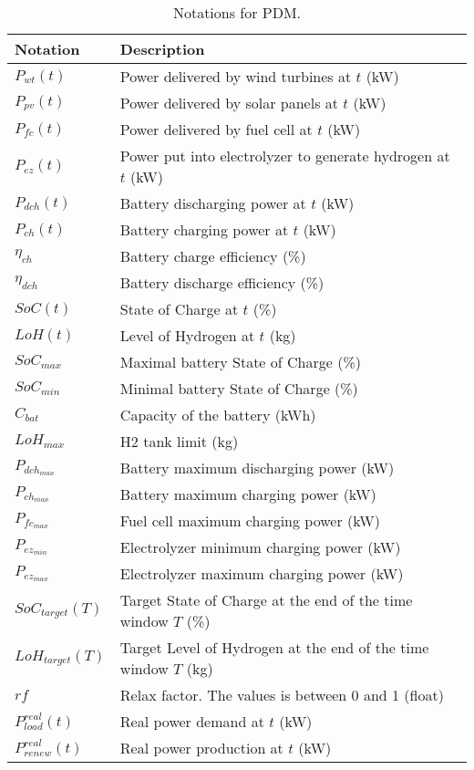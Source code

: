 \begin{table*}[!htb]
\centering
\caption{Notations for PDM.}
\label{tab:notation_power}
\begin{tabular}{l|l}
    \hline
    Notation & Description \\\hline\hline
    $P_{wt}(t)$ & Power delivered by wind turbines at $t$ (kW)\\
    $P_{pv}(t)$ & Power delivered by solar panels at $t$ (kW)\\
    $P_{fc}(t)$ & Power delivered by fuel cell at $t$ (kW)\\
    $P_{ez}(t)$ & Power put into electrolyzer to generate hydrogen at $t$ (kW)\\
    $P_{dch}(t)$ & Battery discharging power at $t$ (kW)\\
    $P_{ch}(t)$ & Battery charging power at $t$ (kW)\\
    $\eta_{ch}$ & Battery charge efficiency (\%)\\
    $\eta_{dch}$ & Battery discharge efficiency (\%)\\
    $SoC(t)$ & State of Charge at $t$ (\%)\\
    $LoH(t)$ & Level of Hydrogen at $t$ (kg)\\
    $SoC_{max}$ & Maximal battery State of Charge (\%)\\
    $SoC_{min}$ & Minimal battery State of Charge (\%)\\
    $C_{bat}$ & Capacity of the battery (kWh)\\
    $LoH_{max}$ & H2 tank limit (kg)\\
    $P_{dch_{max}}$ & Battery maximum discharging power (kW)\\
    $P_{ch_{max}}$ & Battery maximum charging power (kW)\\
    $P_{fc_{max}}$ & Fuel cell maximum charging power (kW)\\
    $P_{ez_{min}}$ & Electrolyzer minimum charging power (kW)\\
    $P_{ez_{max}}$ & Electrolyzer maximum charging power (kW)\\
    $SoC_{target}(T)$ & Target State of Charge at the end of the time window $T$ (\%)\\
    $LoH_{target}(T)$ & Target Level of Hydrogen at the end of the time window $T$ (kg)\\
    $rf$ & Relax factor. The values is between 0 and 1 (float) \\
    $P^{real}_{load}(t)$ & Real power demand at $t$ (kW)\\
    $P^{real}_{renew}(t)$ & Real power production at $t$ (kW)\\
    \hline
\end{tabular}
\end{table*}